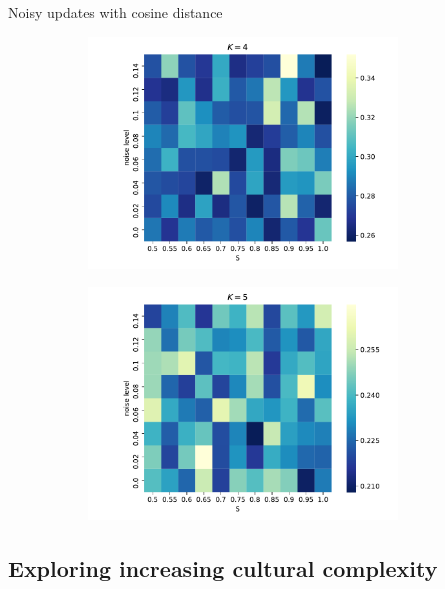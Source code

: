 \documentclass[11pt]{beamer}
\begin{document}
\begin{frame}{Noisy updates with cosine distance}
\begin{figure}[t!]
\begin{subfigure}[t]{0.49\textwidth}
        \includegraphics[width=0.9\textwidth]{Figures/p_v_noise_k=4_cosine_distance.pdf}
    \end{subfigure}
    \begin{subfigure}[t]{0.49\textwidth}
        \centering
        \includegraphics[width=0.9\textwidth]{Figures/p_v_noise_k=5_cosine_distance.pdf}
    \end{subfigure}
    \label{fig:heatmaps}
  \end{figure}
\end{frame}

\subsection{Exploring increasing cultural complexity}
\end{document}
